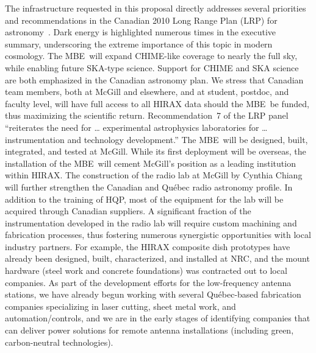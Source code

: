 \documentclass[11pt]{article}
\newcommand{\mbe}{{\rm MBE}}
\begin{document}
The infrastructure requested in this proposal directly addresses
several priorities and recommendations in the Canadian 2010 Long Range
Plan (LRP) for astronomy~\citep{lrp}.  Dark energy is highlighted
numerous times in the executive summary, underscoring the extreme
importance of this topic in modern cosmology.  The \mbe\ will expand
CHIME-like coverage to nearly the full sky, while enabling future
SKA-type science.  Support for CHIME and SKA science are both
emphasized in the Canadian astronomy plan.  We stress that Canadian
team members, both at McGill and elsewhere, and at student, postdoc,
and faculty level, will have full access to all HIRAX data should the
\mbe\ be funded, thus maximizing the scientific return.
Recommendation~7 of the LRP panel ``reiterates the need for \ldots
experimental astrophysics laboratories for \ldots instrumentation and
technology development.''  The \mbe\ will be designed, built,
integrated, and tested at McGill.  While its first deployment will be
overseas, the installation of the \mbe\ will cement McGill's position
as a leading institution within HIRAX.  The construction of the radio
lab at McGill by Cynthia Chiang will further strengthen the Canadian
and Qu\'ebec radio astronomy profile.  In addition to the training of
HQP, most of the equipment for the lab will be acquired through
Canadian suppliers.  A significant fraction of the instrumentation
developed in the radio lab will require custom machining and
fabrication processes, thus fostering numerous synergistic
opportunities with local industry partners.  For example, the HIRAX
composite dish prototypes have already been designed, built,
characterized, and installed at NRC, and the mount hardware (steel
work and concrete foundations) was contracted out to local companies.
As part of the development efforts for the low-frequency antenna
stations, we have already begun working with several Qu\'ebec-based
fabrication companies specializing in laser cutting, sheet metal work,
and automation/controls, and we are in the early stages of identifying
companies that can deliver power solutions for remote antenna
installations (including green, carbon-neutral technologies).

\end{document}
